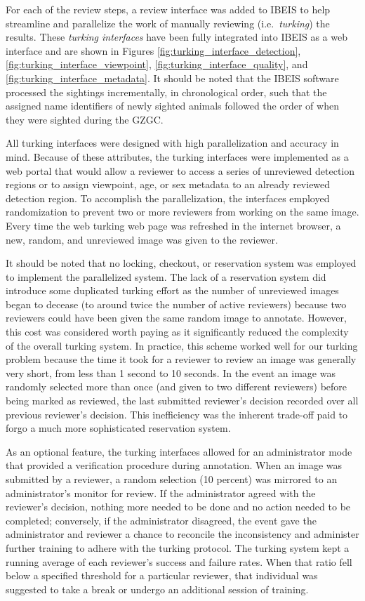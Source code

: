 For each of the review steps, a review interface was added to IBEIS to help streamline and parallelize the work of manually reviewing (i.e.\ \textit{turking}) the results.  These \textit{turking interfaces} have been fully integrated into IBEIS as a web interface and are shown in Figures \ref{fig:turking_interface_detection}, \ref{fig:turking_interface_viewpoint}, \ref{fig:turking_interface_quality}, and \ref{fig:turking_interface_metadata}.  It should be noted that the IBEIS software processed the sightings incrementally, in chronological order, such that the assigned name identifiers of newly sighted animals followed the order of when they were sighted during the GZGC.

All turking interfaces were designed with high parallelization and accuracy in mind.  Because of these attributes, the turking interfaces were implemented as a web portal that would allow a reviewer to access a series of unreviewed detection regions or to assign viewpoint, age, or sex metadata to an already reviewed detection region.  To accomplish the parallelization, the interfaces employed randomization to prevent two or more reviewers from working on the same image.  Every time the web turking web page was refreshed in the internet browser, a new, random, and unreviewed image was given to the reviewer.

It should be noted that no locking, checkout, or reservation system was employed to implement the parallelized system.  The lack of a reservation system did introduce some duplicated turking effort as the number of unreviewed images began to decease (to around twice the number of active reviewers) because two reviewers could have been given the same random image to annotate.  However, this cost was considered worth paying as it significantly reduced the complexity of the overall turking system.  In practice, this scheme worked well for our turking problem because the time it took for a reviewer to review an image was generally very short, from less than 1 second to 10 seconds.  In the event an image was randomly selected more than once (and given to two different reviewers) before being marked as reviewed, the last submitted reviewer's decision recorded over all previous reviewer's decision.  This inefficiency was the inherent trade-off paid to forgo a much more sophisticated reservation system.

As an optional feature, the turking interfaces allowed for an administrator mode that provided a verification procedure during annotation.  When an image was submitted by a reviewer, a random selection (10 percent) was mirrored to an administrator's monitor for review.  If the administrator agreed with the reviewer's decision, nothing more needed to be done and no action needed to be completed; conversely, if the administrator disagreed, the event gave the administrator and reviewer a chance to reconcile the inconsistency and administer further training to adhere with the turking protocol.  The turking system kept a running average of each reviewer's success and failure rates.  When that ratio fell below a specified threshold for a particular reviewer, that individual was suggested to take a break or undergo an additional session of training.

